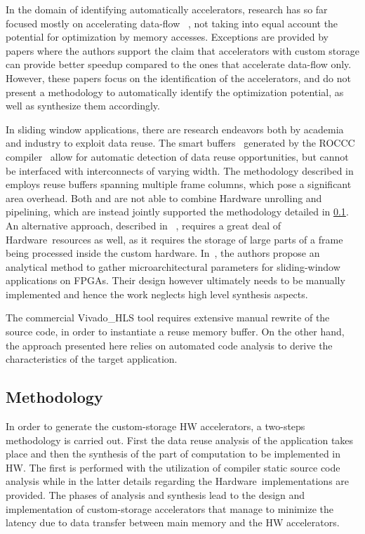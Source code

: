 \documentclass[]{usiinfthesis}
\newcommand{\HW}{{Hardware}}
\begin{document}
In the domain of identifying automatically accelerators, research has 
so far focused mostly on accelerating data-flow~\cite{GiaquintaMar15} \cite{GutinFeb12}, 
not taking into equal account the potential for optimization by memory accesses. 
Exceptions are provided by papers \cite{BiswasMar06} \cite{ HaaBOct2014}
where the authors support the claim that accelerators with custom
storage can provide better speedup compared to the ones that
accelerate data-flow only. However, these papers focus on the
identification of the accelerators, and do not present a methodology 
to automatically identify the optimization potential, as well as
synthesize them accordingly.\par
In sliding window applications, there are research endeavors
both by academia and industry to exploit data reuse. The smart
buffers~\cite{GuoJun04} generated by the ROCCC
compiler~\cite{VillarrealMay10} allow for automatic detection of data
reuse opportunities, but cannot be interfaced 
with interconnects of varying width.
%
The methodology
described in \cite{MeeusMar14} employs reuse buffers spanning multiple
frame columns, which pose a significant area
overhead. Both \cite{GuoJun04} and \cite{MeeusMar14} are not able
to combine Hardware unrolling and pipelining, which are instead jointly
supported the methodology detailed in \ref{sec:dr_meth}. An alternative 
approach, described in
~\cite{DongMar07}, requires a great deal of \HW\ resources as well, as it 
requires the storage of large parts of a frame being processed inside the custom
hardware.  In~\cite{LeeserApr06}, the authors propose an analytical
method to gather microarchitectural parameters for sliding-window
applications on FPGAs. Their design however ultimately needs to be
manually implemented and hence the work neglects high level synthesis
aspects.\par
%
The commercial Vivado\_HLS tool requires
extensive manual rewrite of the source code, in order to instantiate
a reuse memory buffer. On the other hand, the approach presented 
here relies on automated code
analysis to derive the characteristics of the target application.\par 



\subsection{Methodology}
\label{sec:dr_meth}

In order to generate the custom-storage HW accelerators, a two-steps methodology is 
carried out. First the data reuse analysis of the application takes place and 
then the synthesis of the part of computation to be implemented in HW.
The first is performed with the utilization of compiler static source code analysis while
in the latter details regarding the \HW\ implementations are provided.
The phases of analysis and synthesis lead to the design and implementation of 
custom-storage accelerators that manage to minimize the latency due to data 
transfer between main memory and the HW accelerators.
\end{document}
